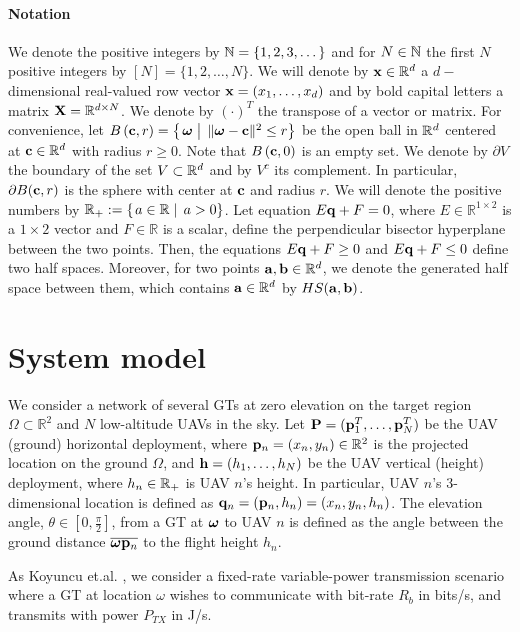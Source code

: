 \documentclass[smallabstract,smallcaptions]{dccpaper}
\newcommand{\Ball}{\ensuremath{B}}          %
\newcommand{\bH}{\ensuremath{\vh}}          %
\newcommand{\Rb}{\ensuremath{R_b}}         %
\newcommand{\philippstart}{\color{black}}
\newcommand{\philippend}{\color{black}}
\begin{document}
\philippstart
\paragraph{Notation} We denote the positive integers by ${\mathbb N}=\{1,2,3,\dots\}$ and for $N\in{\ensuremath{\mathbb N}}$ the first $N$ positive
integers by $[N]=\{1,2,\dots,N\}$. We will denote by ${\mathbf x}\in{\ensuremath{\mathbb R}}^d$ a $d-$dimensional real-valued row vector
${\mathbf x}=(x_1,\dots,x_d)$ and by bold capital letters a matrix ${\mathbf X}={\mathbb R}^{d\times N}$. We denote by $(\cdot)^T$ the transpose
of a vector or matrix.   For convenience, let $\Ball\left(\vc,r\right)=\set{\vome}{\|\vome-\vc\|^2\le r}$ be the open ball in
${\mathbb R}^d$ centered at ${\mathbf c}\in{\ensuremath{\mathbb R}}^d$ with radius $r\geq 0$. Note that $\Ball\left(\vc,0\right)$ is an empty set. We denote by
$\partial V$ the boundary of the set $V\subset{\ensuremath{\mathbb R}}^d$ and by $V^c$ its complement. In particular, $\partial
\Ball(\vc,r)$ is the sphere with center at ${\mathbf c}$ and radius $r$. We will denote the positive numbers by
$\R_+:=\set{a\in\R}{a>0}$.  Let equation $E{\mathbf q} + F = 0$, where
$E\in\mathbb{R}^{1\times2}$ is a $1\times2$ vector and $F\in\mathbb{R}$ is a scalar, define the perpendicular bisector
hyperplane between the two points.  Then, the equations $E{\mathbf q} +F\ge0$ and $E{\mathbf q} +F\le0$ define two half spaces.
Moreover, for two points ${\mathbf a},{\mathbf b}\in{\ensuremath{\mathbb R}}^d$, we denote
the generated half space between them, which contains ${\mathbf a}\in{\ensuremath{\mathbb R}}^d$ by $HS({\mathbf a}, {\mathbf b})$.
\philippend

\section{System model}\label{sec:model}
%
We consider a network of several GTs at zero elevation on the target region $\Omega\subset\mathbb{R}^2$ and $N$
low-altitude UAVs in the sky.  Let $\mathbf P =({\mathbf p}_1^T,\dots,{\mathbf p}_N^T)$ be the UAV (ground) horizontal deployment, where
${\mathbf p}_n=(x_n, y_n)\in\mathbb{R}^2$ is the projected location on the ground $\Omega$, and $\bH=(h_1,\dots,h_N)$ be the
UAV vertical (height) deployment, where $h_n\in{\ensuremath{\mathbb R}}_+$ is UAV $n$'s height.  In particular, UAV $n$'s 3-dimensional
location is defined as ${\mathbf q}_n=({\mathbf p}_n,h_n)=(x_n,y_n, h_n)$.  The elevation angle, $\theta\in[0,\frac{\pi}{2}]$, from
a GT at $\boldsymbol{ \omega}$ to UAV $n$ is defined as the angle between the ground distance $\overline{\boldsymbol{ \omega} {\mathbf p}_n}$ to the flight
height $h_n$.




As Koyuncu et.al. \cite{Erdem}, we consider a fixed-rate variable-power transmission scenario where a GT at location
$\omega$ wishes to communicate with bit-rate $\Rb$ in bits/s, and transmits with power $P_{TX}$ in J/s. 
 
\end{document}
